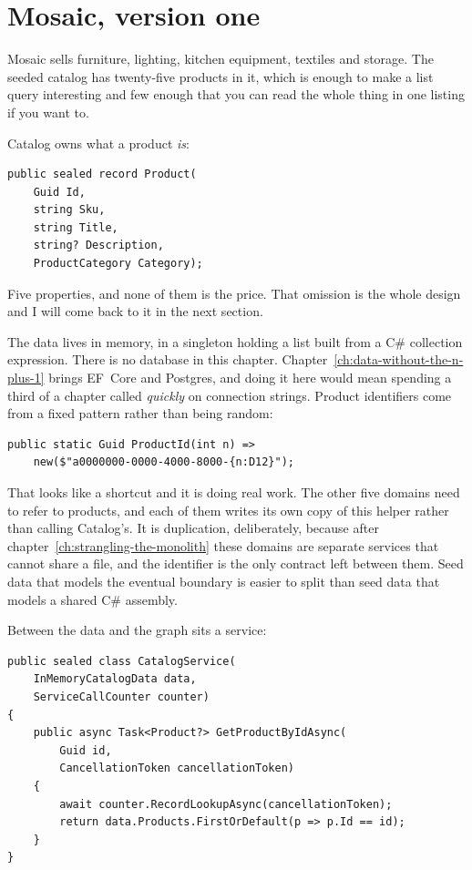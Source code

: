 \section{Mosaic, version one}
\label{sec:ch02-mosaic-v1}

Mosaic sells furniture, lighting, kitchen equipment, textiles and storage. The
seeded catalog has twenty-five products in it, which is enough to make a list
query interesting and few enough that you can read the whole thing in one
listing if you want to.

Catalog owns what a product \emph{is}:

\begin{verbatim}
public sealed record Product(
    Guid Id,
    string Sku,
    string Title,
    string? Description,
    ProductCategory Category);
\end{verbatim}

Five properties, and none of them is the price. That omission is the whole
design and I will come back to it in the next section.

%
The data lives in memory, in a singleton holding a list built from a C\#
collection expression. There is no database in this chapter.
Chapter~\ref{ch:data-without-the-n-plus-1} brings EF~Core and Postgres, and
doing it here would mean spending a third of a chapter called \emph{quickly} on
connection strings. Product identifiers come from a fixed pattern rather than
being random:

\begin{verbatim}
public static Guid ProductId(int n) =>
    new($"a0000000-0000-4000-8000-{n:D12}");
\end{verbatim}

That looks like a shortcut and it is doing real work. The other five domains
need to refer to products, and each of them writes its own copy of this helper
rather than calling Catalog's. It is duplication, deliberately, because after
chapter~\ref{ch:strangling-the-monolith} these domains are separate services
that cannot share a file, and the identifier is the only contract left between
them. Seed data that models the eventual boundary is easier to split than seed
data that models a shared C\# assembly.

%
Between the data and the graph sits a service:

\begin{verbatim}
public sealed class CatalogService(
    InMemoryCatalogData data,
    ServiceCallCounter counter)
{
    public async Task<Product?> GetProductByIdAsync(
        Guid id,
        CancellationToken cancellationToken)
    {
        await counter.RecordLookupAsync(cancellationToken);
        return data.Products.FirstOrDefault(p => p.Id == id);
    }
}
\end{verbatim}


